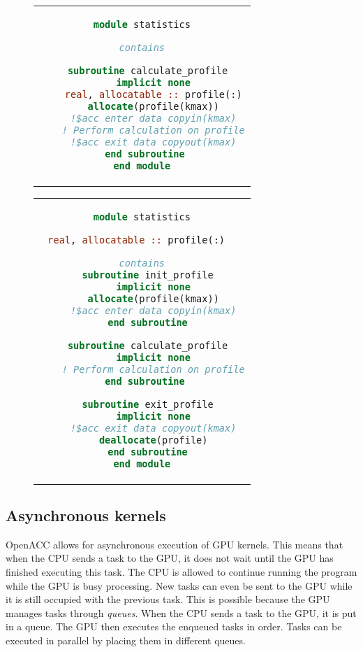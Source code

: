 \begin{figure}[ht]
  \centering
  \label{lst:memory_allocation}
  \begin{adjustbox}{valign=t, minipage=0.48\linewidth}
    \centering
    \begin{tabular}{c}
      \begin{lstlisting}[language=Fortran]
module statistics

contains

  subroutine calculate_profile
    implicit none
    real, allocatable :: profile(:)
    allocate(profile(kmax))
    !$acc enter data copyin(kmax)
    ! Perform calculation on profile
    !$acc exit data copyout(kmax)
  end subroutine 
end module
      \end{lstlisting}
    \end{tabular}
  \end{adjustbox}
  \hfill
  \begin{adjustbox}{valign=t, minipage=0.48\linewidth}
    \centering
    \begin{tabular}{c}
      \begin{lstlisting}[language=Fortran]
module statistics

real, allocatable :: profile(:)  

contains
  subroutine init_profile
    implicit none
    allocate(profile(kmax))
    !$acc enter data copyin(kmax)
  end subroutine

  subroutine calculate_profile
    implicit none
    ! Perform calculation on profile
  end subroutine 

  subroutine exit_profile
    implicit none
    !$acc exit data copyout(kmax)
    deallocate(profile)
  end subroutine
end module
      \end{lstlisting}
    \end{tabular}
  \end{adjustbox}
\end{figure}

\subsection{Asynchronous kernels}
OpenACC allows for asynchronous execution of GPU kernels. This means that when the CPU sends a task to the GPU, it does not wait until the GPU has finished executing this task. The CPU is allowed to continue running the program while the GPU is busy processing. New tasks can even be sent to the GPU while it is still occupied with the previous task. This is possible because the GPU manages tasks through \emph{queues}. When the CPU sends a task to the GPU, it is put in a queue. The GPU then executes the enqueued tasks in order. Tasks can be executed in parallel by placing them in different queues.

